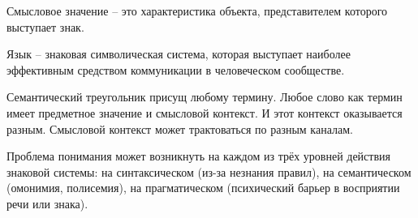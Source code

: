 \documentclass[exam_answers.tex]{subfiles}
\begin{document}
Смысловое значение – это характеристика объекта, представителем которого выступает знак.

Язык – знаковая символическая система, которая выступает наиболее эффективным средством коммуникации в человеческом сообществе.

Семантический треугольник присущ любому термину.
Любое слово как термин имеет предметное значение и смысловой контекст.
И этот контекст оказывается разным.
Смысловой контекст может трактоваться по разным каналам.

Проблема понимания может возникнуть на каждом из трёх уровней действия знаковой системы: на синтаксическом (из-за незнания правил), на семантическом (омонимия, полисемия), на прагматическом (психический барьер в восприятии речи или знака).
\end{document}
